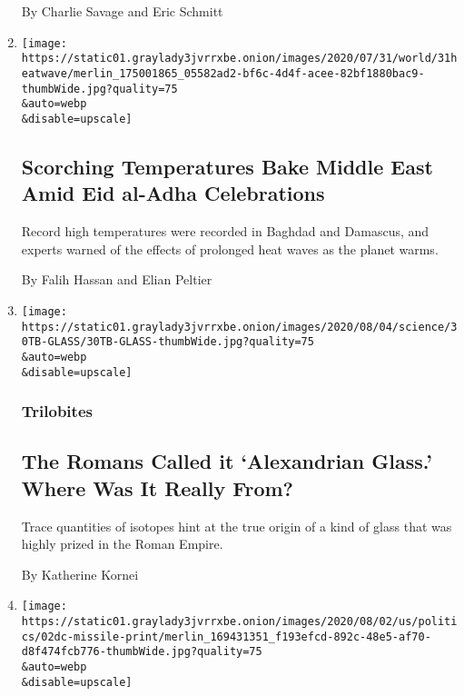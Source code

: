 \begin{enumerate}
  By Charlie Savage and Eric Schmitt
\item
  \href{/2020/07/31/world/middleeast/Middle-East-heat-wave.html}{}

  \texttt{[image: https://static01.graylady3jvrrxbe.onion/images/2020/07/31/world/31heatwave/merlin\_175001865\_05582ad2-bf6c-4d4f-acee-82bf1880bac9-thumbWide.jpg?quality=75\\\&auto=webp\\\&disable=upscale]}

  \hypertarget{scorching-temperatures-bake-middle-east-amid-eid-al-adha-celebrations}{%
  \subsection{Scorching Temperatures Bake Middle East Amid Eid al-Adha
  Celebrations}\label{scorching-temperatures-bake-middle-east-amid-eid-al-adha-celebrations}}

  Record high temperatures were recorded in Baghdad and Damascus, and
  experts warned of the effects of prolonged heat waves as the planet
  warms.

  By Falih Hassan and Elian Peltier
\item
  \href{/2020/07/31/science/alexandrian-glass-rome.html}{}

  \texttt{[image: https://static01.graylady3jvrrxbe.onion/images/2020/08/04/science/30TB-GLASS/30TB-GLASS-thumbWide.jpg?quality=75\\\&auto=webp\\\&disable=upscale]}

  \hypertarget{trilobites}{%
  \subsubsection{Trilobites}\label{trilobites}}

  \hypertarget{the-romans-called-it-alexandrian-glass-where-was-it-really-from}{%
  \subsection{The Romans Called it `Alexandrian Glass.' Where Was It
  Really
  From?}\label{the-romans-called-it-alexandrian-glass-where-was-it-really-from}}

  Trace quantities of isotopes hint at the true origin of a kind of
  glass that was highly prized in the Roman Empire.

  By Katherine Kornei
\item
  \href{/2020/07/30/world/asia/afghanistan-taliban-helicopter-missile.html}{}

  \texttt{[image: https://static01.graylady3jvrrxbe.onion/images/2020/08/02/us/politics/02dc-missile-print/merlin\_169431351\_f193efcd-892c-48e5-af70-d8f474fcb776-thumbWide.jpg?quality=75\\\&auto=webp\\\&disable=upscale]}


\end{enumerate}
